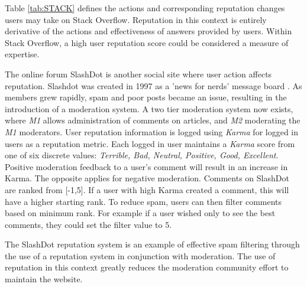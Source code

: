 

Table \ref{tab:STACK} defines the actions and corresponding reputation changes users may take on Stack Overflow. Reputation in this context is entirely derivative of the actions and effectiveness of answers provided by users. Within Stack Overflow, a high user reputation score could be considered a measure of expertise.

The online forum SlashDot \cite{slashdot_site} is another social site where user action affects reputation. Slashdot was created in 1997 as a 'news for nerds' message board \cite{josang2007survey}. As members grew rapidly, spam and poor posts became an issue, resulting in the introduction of a moderation system. A two tier moderation system now exists, where \textit{M1} allows administration of comments on articles, and \textit{M2} moderating the \textit{M1} moderators. User reputation information is logged using \textit{Karma} for logged in users as a reputation metric. Each logged in user maintains a \textit{Karma} score from one of six discrete values: \textit{Terrible, Bad, Neutral, Positive, Good, Excellent}. Positive moderation feedback to a user's comment will result in an increase in Karma. The opposite applies for negative moderation. Comments on SlashDot are ranked from [-1,5]. If a user with high Karma created a comment, this will have a higher starting rank. To reduce spam, users can then filter 
comments based on minimum rank. For example if a user wished only to see the best comments, they could set the filter value to 5. 

The SlashDot reputation system is an example of effective spam filtering through the use of a reputation system in conjunction with moderation. The use of reputation in this context greatly reduces the moderation community effort to maintain the website. 




